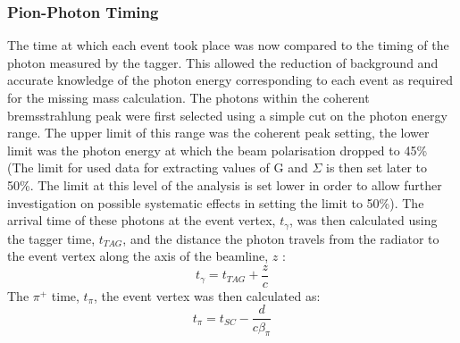 \subsubsection{Pion-Photon Timing}
The time at which each event took place was now compared to the timing of the photon measured by the tagger. This allowed the reduction of background and accurate knowledge of the photon energy corresponding to each event as required for the missing mass calculation. The photons within the coherent bremsstrahlung peak were first selected using a simple cut on the photon energy range. The upper limit of this range was the coherent peak setting, the lower limit was the photon energy at which the beam polarisation dropped to 45\% (The limit for used data for extracting values of G and $\Sigma$ is then set later to 50\%. The limit at this level of the analysis is set lower in order to allow further investigation on possible systematic effects in setting the limit to 50\%). The arrival time of these photons at the event vertex, $ t_\gamma$, was then calculated using the tagger time, $t_{TAG}$, and the distance the photon travels from the radiator to the event vertex along the axis of the beamline, $z$ :
\begin{equation} \label{eqn:t_tag}
  t_\gamma = t_{TAG} + \frac{z}{c}
\end{equation}
The $\pi^+$ time, $t_\pi$, the event vertex was then calculated as:
\begin{equation} \label{eqn:t_sc}
  t_\pi = t_{SC} - \frac{d}{c \beta_\pi}
\end{equation}
